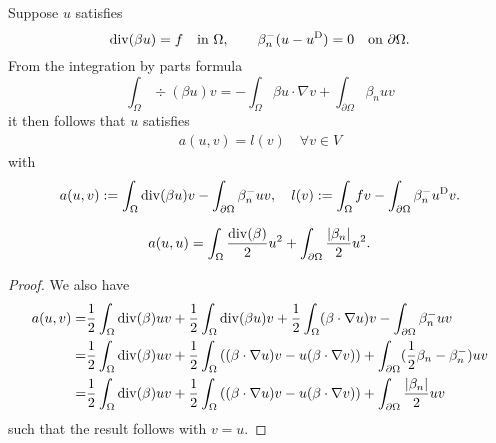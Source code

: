 Suppose $u$ satisfies
%
\begin{equation}\label{eq:transport}
\operatorname{div}(\beta u) = f\quad\mbox{in $\Omega$},\qquad \beta_n^{-}(u-u^{\rm D}) = 0\quad \mbox{on $\partial\Omega$}.
\end{equation}
%
From the integration by parts formula
%
\begin{equation}\label{eq:}
\int_{\Omega}\div(\beta u ) v  = - \int_{\Omega}\beta u \cdot \nabla v + \int_{\partial\Omega} \beta_n uv
\end{equation}
%
it then follows that $u$ satisfies 
%
\begin{align*}
a(u,v)=l(v)\quad \forall v\in V
\end{align*}
%
with
%
\begin{equation}\label{eq:}
a(u,v) := \int_{\Omega}\operatorname{div}(\beta u)   v  - \int_{\partial\Omega} \beta_n^- uv,\quad l(v) := \int_{\Omega} fv -\int_{\partial\Omega} \beta_n^- u^{\rm D} v.
\end{equation}
%
\begin{lemma}\label{lemma:}
%
\begin{equation}\label{eq:}
a(u,u) = \int_{\Omega}\frac{\operatorname{div}(\beta)}{2} u^2 +  \int_{\partial\Omega} \frac{\left|\beta_n\right|}{2} u^2.
\end{equation}
%
\end{lemma}
%
\begin{proof}
We also have
%
\begin{align*}
a(u,v) =& \frac12\int_{\Omega}\operatorname{div}(\beta) u  v +\frac12\int_{\Omega} \operatorname{div}(\beta u)v +\frac12\int_{\Omega} (\beta\cdot \nabla u)v - \int_{\partial\Omega} \beta_n^- uv\\
=& \frac12\int_{\Omega}\operatorname{div}(\beta) u  v +\frac12\int_{\Omega} \left((\beta\cdot \nabla u)v-u(\beta\cdot \nabla v)\right)  + \int_{\partial\Omega} (\frac12\beta_n-\beta_n^-) uv\\
=& \frac12\int_{\Omega}\operatorname{div}(\beta) u  v +\frac12\int_{\Omega} \left((\beta\cdot \nabla u)v-u(\beta\cdot \nabla v)\right)  + \int_{\partial\Omega} \frac{\left|\beta_n\right|}{2} uv
\end{align*}
%
such that the result follows with $v=u$.
\end{proof}
%
%

